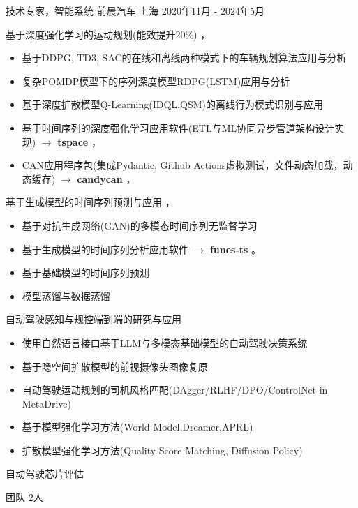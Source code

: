 \documentclass[../cv_cn.tex]{subfiles}
\begin{document}
\begin{cventries}
	\breakablecventry
	{技术专家，智能系统} %
	{前晨汽车} %
	{上海} %
	{2020年11月 - 2024年5月} %
	{
		\begin{cvitems} %
			\item 基于深度强化学习的运动规划(能效提升20\%) \supercite{xin2026ieee} \supercite{Xin_VEOS_22} \supercite{Xin_Fu_Pan_Simulation_Test_RL_22} \supercite{Pan_Xin_DrvStyle_23}，
			\begin{itemize}
				\item 基于DDPG, TD3, SAC的在线和离线两种模式下的车辆规划算法应用与分析
				\item 复杂POMDP模型下的序列深度模型RDPG(LSTM)应用与分析
				\item 基于深度扩散模型Q-Learning(IDQL,QSM)的离线行为模式识别与应用
				\item 基于时间序列的深度强化学习应用软件(ETL与ML协同异步管道架构设计实现) $\rightarrow$ \textbf{tspace} \href{https://binjian.github.io/tspace/}{\faGithub}，
				\item CAN应用程序包(集成Pydantic, Github Actions虚拟测试，文件动态加载，动态缓存) $\rightarrow$ \textbf{candycan} \href{https://binjian.github.io/candycan/}{\faGithub}，
			\end{itemize}
			\item 基于生成模型的时间序列预测与应用 \supercite{Xin_GenAI_23} \supercite{Xin_Chen_NN_TSFeatures_23}，
			\begin{itemize}
				\item 基于对抗生成网络(GAN)的多模态时间序列无监督学习
				\item 基于生成模型的时间序列分析应用软件 $\rightarrow$ \textbf{funes-ts} \href{https://github.com/binjian/funes-ts/}{\faGithub}。
				\item 基于基础模型的时间序列预测
				\item 模型蒸馏与数据蒸馏
			\end{itemize}
			\pagebreak
			\item 自动驾驶感知与规控端到端的研究与应用
			\begin{itemize}
				\item 使用自然语言接口基于LLM与多模态基础模型的自动驾驶决策系统 \supercite{Xin_LLM_24} \supercite{Xin_VLM_24}
				\item 基于隐空间扩散模型的前视摄像头图像复原\supercite{Xin_Latent_Diffusion_23}
				\item 自动驾驶运动规划的司机风格匹配(DAgger/RLHF/DPO/ControlNet in MetaDrive)
				\item 基于模型强化学习方法(World Model,Dreamer,APRL)
				\item 扩散模型强化学习方法(Quality Score Matching, Diffusion Policy)
			\end{itemize}
			\item 自动驾驶芯片评估
			\item 团队 2人
		\end{cvitems}
	}


\end{cventries}
\end{document}
